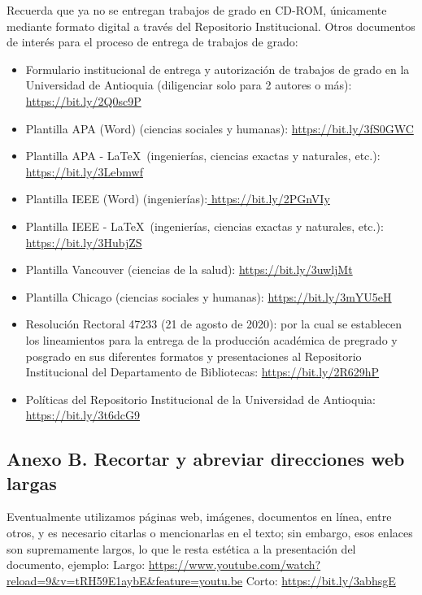 Recuerda que ya no se entregan trabajos de grado en CD-ROM, únicamente mediante formato digital a través del Repositorio Institucional. Otros documentos de interés para el proceso de entrega de trabajos de grado:

\begin{itemize}
    \item  Formulario institucional de entrega y autorización de trabajos de grado en la Universidad de Antioquia (diligenciar solo para 2 autores o más): \url{https://bit.ly/2Q0sc9P}
    \item  Plantilla APA (Word) (ciencias sociales y humanas): \url{https://bit.ly/3fS0GWC}
     \item Plantilla APA - \LaTeX \ (ingenierías, ciencias exactas y naturales, etc.): \url{https://bit.ly/3Lebmwf}
    \item  Plantilla IEEE (Word) (ingenierías):\url{ https://bit.ly/2PGnVIy}
    \item Plantilla IEEE - \LaTeX \ (ingenierías, ciencias exactas y naturales, etc.): \url{https://bit.ly/3HubjZS}
    \item  Plantilla Vancouver (ciencias de la salud): \url{https://bit.ly/3uwljMt}
    \item  Plantilla Chicago (ciencias sociales y humanas): \url{https://bit.ly/3mYU5eH}
    \item  Resolución Rectoral 47233 (21 de agosto de 2020): por la cual se establecen los lineamientos para la entrega de la producción académica de pregrado y posgrado en sus diferentes formatos y presentaciones al Repositorio Institucional del Departamento de Bibliotecas: \url{https://bit.ly/2R629hP}
    \item  Políticas del Repositorio Institucional de la Universidad de Antioquia: \url{https://bit.ly/3t6dcG9}
\end{itemize}


\newpage


{}
\subsection*{Anexo B. Recortar y abreviar direcciones web largas}


Eventualmente utilizamos páginas web, imágenes, documentos en línea, entre otros, y es necesario citarlas o mencionarlas en el texto; sin embargo, esos enlaces son supremamente largos, lo que le resta estética a la presentación del documento, ejemplo:\newline
Largo: \url{https://www.youtube.com/watch?reload=9&v=tRH59E1aybE&feature=youtu.be}\newline
Corto: \url{https://bit.ly/3abhsgE}

